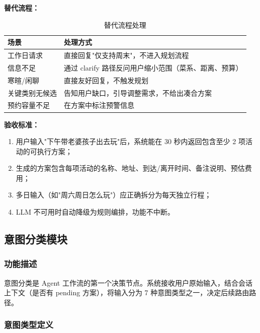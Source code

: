 \documentclass[12pt,a4paper]{ctexart}
\begin{document}
\textbf{替代流程：}

\begin{table}[ht]
\centering
\begin{tabular}{p{3.5cm}p{9cm}}
\toprule
\textbf{场景} & \textbf{处理方式} \\
\midrule
工作日请求 & 直接回复"仅支持周末"，不进入规划流程 \\
信息不足 & 通过 clarify 路径反问用户缩小范围（菜系、距离、预算） \\
寒暄/闲聊 & 直接友好回复，不触发规划 \\
关键类别无候选 & 告知用户缺口，引导调整需求，不给出凑合方案 \\
预约容量不足 & 在方案中标注预警信息 \\
\bottomrule
\end{tabular}
\caption{替代流程处理}
\label{tab:alt-flows}
\end{table}

\textbf{验收标准：}

\begin{enumerate}[label=(\arabic*)]
  \item 用户输入"下午带老婆孩子出去玩"后，系统能在 30 秒内返回包含至少 2 项活动的可执行方案；
  \item 生成的方案包含每项活动的名称、地址、到达/离开时间、备注说明、预估费用；
  \item 多日输入（如"周六周日怎么玩"）应正确拆分为每天独立行程；
  \item LLM 不可用时自动降级为规则编排，功能不中断。
\end{enumerate}

\newpage

\subsection{意图分类模块}

\subsubsection{功能描述}

意图分类是 Agent 工作流的第一个决策节点。系统接收用户原始输入，结合会话上下文（是否有 pending 方案），将输入分为 7 种意图类型之一，决定后续路由路径。

\subsubsection{意图类型定义}
\end{document}
